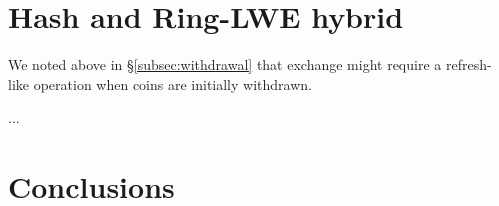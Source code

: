 \documentclass{llncs}
\begin{document}
\section{Hash and Ring-LWE hybrid}

We noted above in \S\ref{subsec:withdrawal} that exchange might
require a refresh-like operation when coins are initially withdrawn.

...

\section{Conclusions}






\end{document}

